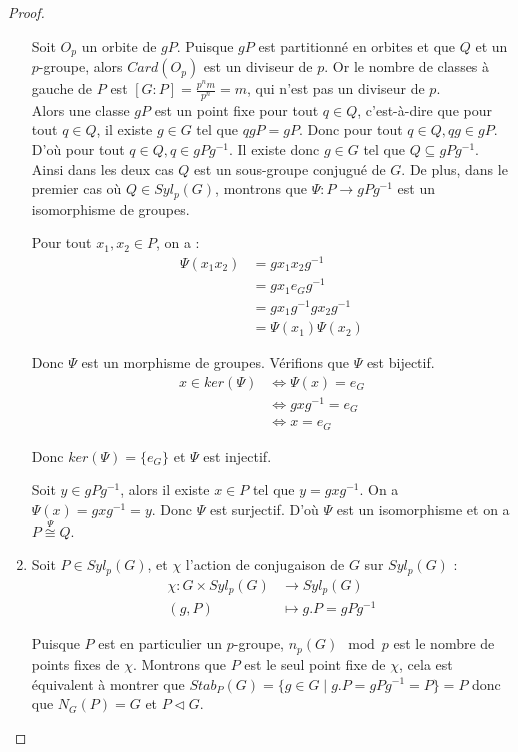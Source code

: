 \documentclass{article}
\theoremstyle{definition}
\theoremstyle{plain}
\theoremstyle{plain}
\theoremstyle{plain}
\theoremstyle{plain}
\theoremstyle{definition}
\theoremstyle{plain}
\theoremstyle{plain}
\begin{document}
\begin{proof}
\begin{enumerate}[label={\upshape(\roman*)}]
Soit \( O_{p} \) un orbite de \( gP \). Puisque \( gP \) est partitionné en orbites et que \( Q \) et un \(p\)-groupe, alors \( Card(O_{p}) \) est un diviseur de \( p \). Or le nombre de classes à gauche de \( P \) est \([G : P] = \frac{p^{n}m}{p^{n}} = m  \), qui n'est pas un diviseur de \( p \). \\
Alors une classe \( gP \) est un point fixe pour tout \( q \in Q \), c'est-à-dire que pour tout \( q \in Q \), il existe \( g \in G \) tel que \( qgP = gP \). 
Donc pour tout \( q \in Q, qg \in gP \). 
D'où pour tout \( q \in Q, q \in gPg^{-1} \). Il existe donc \( g \in G \) tel que \( Q \subseteq gPg^{-1} \).\\ 
Ainsi dans les deux cas \( Q \) est un sous-groupe conjugué de \( G \). 
De plus, dans le premier cas où \( Q \in Syl_p(G) \), montrons que \( \varPsi : P \rightarrow gPg^{-1} \) est un isomorphisme de groupes.

Pour tout \( x_1,x_2 \in P \), on a :
\begin{align*}
	\varPsi(x_1x_2) &= gx_1x_2g^{-1} \\
			&= gx_1e_Gg^{-1} \\
			&= gx_1g^{-1}gx_2g^{-1} \\
			&= \varPsi(x_1)\varPsi(x_2) 
\end{align*}

Donc \( \varPsi \) est un morphisme de groupes. Vérifions que \( \varPsi \) est bijectif.
\begin{align*}
	x \in ker(\varPsi) &\iff \varPsi(x) = e_G \\
			   &\iff gxg^{-1} = e_G \\
			   &\iff x = e_G
\end{align*}

Donc \( ker(\varPsi) = \{e_G\} \) et \( \varPsi \) est injectif. 

Soit \( y \in gPg^{-1} \), alors il existe \( x \in P \) tel que \( y = gxg^{-1} \). On a \( \varPsi(x) = gxg^{-1} = y \). Donc \( \varPsi \) est surjectif. D'où \( \varPsi \) est un isomorphisme et on a \( P \overset{\varPsi}{\cong} Q \).

\item Soit \( P \in Syl_{p}(G) \), et \( \chi \) l'action de conjugaison de \( G \) sur \( Syl_{p}(G) \) :
\begin{align*}
	\chi : G \times Syl_{p}(G) &\to Syl_{p}(G) \\
	(g,P) &\mapsto g.P = gPg^{-1}
\end{align*}

Puisque \( P \) est en particulier un \(p\)-groupe, \( n_p(G) \mod p \) est le nombre de points fixes de \( \chi \). Montrons que \( P \) est le seul point fixe de \( \chi \), cela est équivalent à montrer que \( Stab_P(G) = \{ g \in G \mid g.P = gPg^{-1} = P \} = P \) donc que \( N_G(P) = G \) et \( P \triangleleft G \). 


\end{enumerate}
\end{proof}
\end{document}
